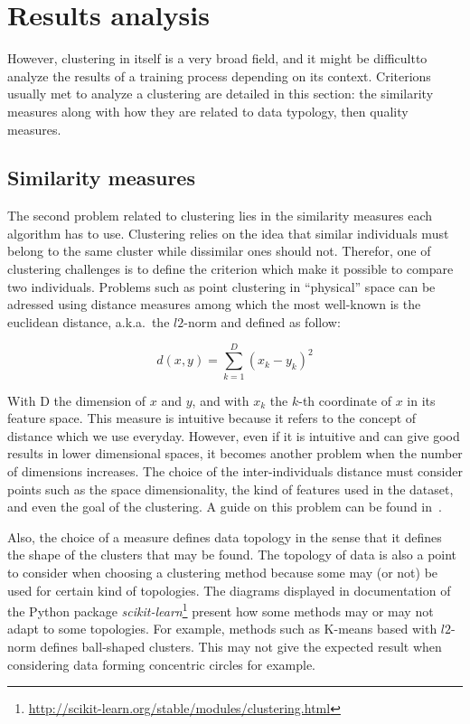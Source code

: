     \section{Results analysis}
    However, clustering in itself is a very broad field, and it might be difficultto analyze the results of a training process depending on its context. Criterions usually met to analyze a clustering are detailed in this section: the similarity measures along with how they are related to data typology, then quality measures.
    
    \subsection{Similarity measures}
    The second problem related to clustering lies in the similarity measures each algorithm has to use. Clustering relies on the idea that similar individuals must belong to the same cluster while dissimilar ones should not. Therefor, one of clustering challenges is to define the criterion which make it possible to compare two individuals. Problems such as point clustering in ``physical'' space can be adressed using distance measures among which the most well-known is the euclidean distance, a.k.a.\ the $l2$-norm and defined as follow: 
    
    \begin{equation}
    d\left(x,y\right) = \sum_{k=1}^D {\left(x_k - y_k\right)}^2
    \end{equation}

    With D the dimension of $x$ and $y$, and with $x_k$ the $k$-th coordinate of $x$ in its feature space. This measure is intuitive because it refers to the concept of distance which we use everyday. However, even if it is intuitive and can give good results in lower dimensional spaces, it becomes another problem when the number of dimensions increases. The choice of the inter-individuals distance must consider points such as the space dimensionality, the kind of features used in the dataset, and even the goal of the clustering. A guide on this problem can be found in~\cite{domingos2012few}.

    Also, the choice of a measure defines data topology in the sense that it defines the shape of the clusters that may be found. The topology of data is also a point to consider when choosing a clustering method because some may (or not) be used for certain kind of topologies. The diagrams displayed in documentation of the Python package \textit{scikit-learn}\footnote{\url{http://scikit-learn.org/stable/modules/clustering.html}} present how some methods may or may not adapt to some topologies. For example, methods such as K-means based with $l2$-norm defines ball-shaped clusters. This may not give the expected result when considering data forming concentric circles for example.

